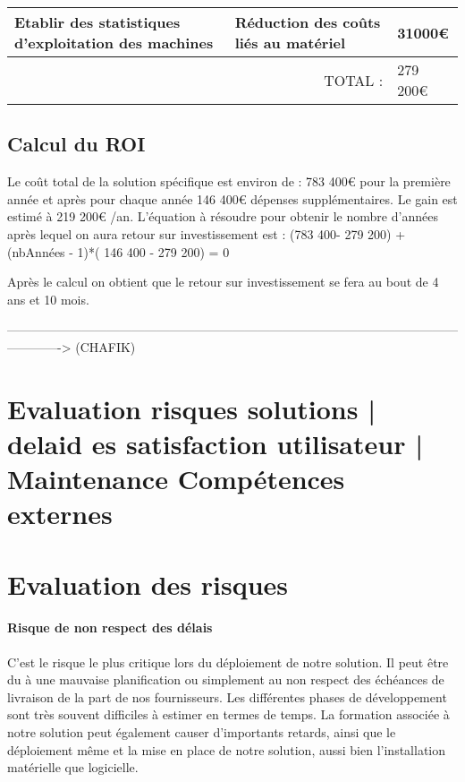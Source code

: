 \begin{tabular}{|p{7cm}|p{5cm}|p{2cm}|}
Etablir des statistiques d'exploitation des machines
                                  & Réduction des coûts liés au matériel
                                                          &  31000€ \\ \hline  
\multicolumn{2}{|r|}{TOTAL :} & 279 200€ \\ \hline                                                                                                                                                                                                                      
      
\end{tabular}
        
\subsection{Calcul du ROI}

Le coût total de la solution spécifique est environ de : 783 400€ pour la première année et après pour chaque année 146 400€ dépenses supplémentaires. Le gain est estimé à 219 200€ /an. L'équation à résoudre pour obtenir le nombre
d'années après lequel on aura retour sur investissement est : (783 400- 279 200) + (nbAnnées - 1)*( 146 400 - 279 200) = 0

Après le calcul on obtient que le retour sur investissement se fera au bout de 4 ans et 10 mois.


-------------------------------------------------------------------------------------------------------------------------> (CHAFIK)
\section{Evaluation risques solutions | delaid es satisfaction utilisateur | Maintenance Compétences externes}

\section{Evaluation des risques}

\paragraph{Risque de non respect des délais\\}
C'est le risque le plus critique lors du déploiement de notre solution. Il peut être du à une mauvaise planification ou simplement au non respect des échéances de livraison de la part de nos fournisseurs. Les différentes phases de développement sont très souvent difficiles à estimer en termes de temps.
La formation associée à notre solution peut également causer d'importants retards, ainsi que le déploiement même et la mise en place de notre solution, aussi bien l'installation matérielle que logicielle.

